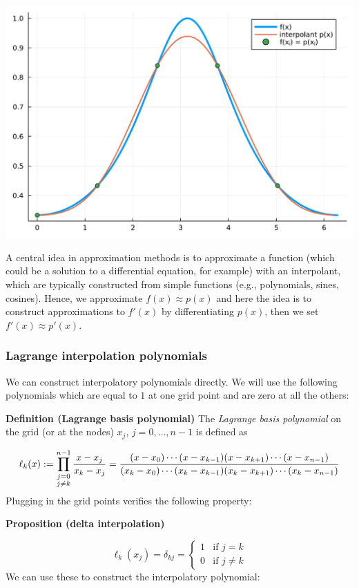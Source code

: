 \documentclass[12pt,a4paper]{article}
\begin{document}
\includegraphics[width=\linewidth]{jl_q9oYGN/Chapter1_1_1.pdf}

A central idea in approximation methods is to approximate a function (which could be a solution to a differential equation, for example) with an interpolant, which are typically constructed from simple functions (e.g., polynomials, sines, cosines).  Hence, we approximate $f(x) \approx p(x)$ and here the idea is to  construct approximations to $f'(x)$ by differentiating $p(x)$, then we set $f'(x) \approx p'(x)$.

\subsubsection{Lagrange interpolation polynomials}
We can construct interpolatory polynomials directly. We will use the following polynomials which are equal to $1$ at one grid point and are zero at all the others:

\textbf{Definition (Lagrange basis polynomial)} The \emph{Lagrange basis polynomial} on the grid (or at the nodes)  $x_{j}$, $j = 0, \ldots, n-1$  is defined as

\[
\ensuremath{\ell}_k(x) := \prod_{\substack{j = 0 \\ j \neq k}}^{n-1} {x-x_j \over x_k - x_j} =  {(x-x_0) \ensuremath{\cdots}(x-x_{k-1})(x-x_{k+1}) \ensuremath{\cdots} (x-x_{n-1}) \over (x_k - x_0) \ensuremath{\cdots} (x_k - x_{k-1}) (x_k - x_{k+1}) \ensuremath{\cdots} (x_k - x_{n-1})}
\]
Plugging in the grid points verifies the following property:

\textbf{Proposition (delta interpolation)}

\[
\ensuremath{\ell}_k(x_j) = \ensuremath{\delta}_{kj} = \begin{cases}
1 & \text{if } j = k \\
0 & \text{if } j \neq k
\end{cases}
\]
We can use these to construct the interpolatory polynomial:
\end{document}
